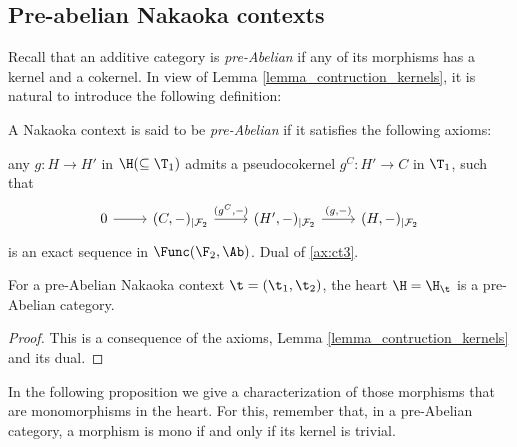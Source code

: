 \subsection{Pre-abelian Nakaoka contexts}

Recall that an additive category is  {\em pre-Abelian} if any of its morphisms has a kernel and a cokernel. In view of  Lemma \ref{lemma_contruction_kernels}, it is natural to introduce the following definition:

\begin{definition}
A Nakaoka context is said to be {\em pre-Abelian} if it satisfies the following axioms:
\begin{torsionaxioms}\setcounter{enumi}{2}
\item\label{ax:ct3} any  $g\colon H\to H'$ in $\H(\subseteq \T_1)$ admits a pseudocokernel $g^C\colon H'\to C$ in $\T_1$, such that
\begin{equation*}
\begin{tikzcd}
0\arrow{r} &(C,-)_{|\mathcal{F}_2}\arrow{r}{(g^C,-)} & (H',-)_{|\mathcal{F}_2}\arrow{r}{(g,-)}& (H,-)_{|\mathcal{F}_2}
\end{tikzcd}
\end{equation*}
is an exact sequence in $\Func(\F_2,\Ab)$. 
\varitem{^\ast}\label{ax:ct3op} Dual of \ref{ax:ct3}.
\end{torsionaxioms}
\end{definition}



\begin{thm}\label{pre_abelian_theorem}
For a pre-Abelian Nakaoka context $\t=(\t_1,\t_2)$, the heart $\H=\H_\t$ is a pre-Abelian category.
\end{thm}
\begin{proof}
This is a consequence of the axioms, Lemma \ref{lemma_contruction_kernels} and its dual.
\end{proof}

In the following proposition we give a characterization of those morphisms that are monomorphisms in the heart. For this, remember that, in a pre-Abelian category, a morphism is mono if and only if its kernel is trivial. 

